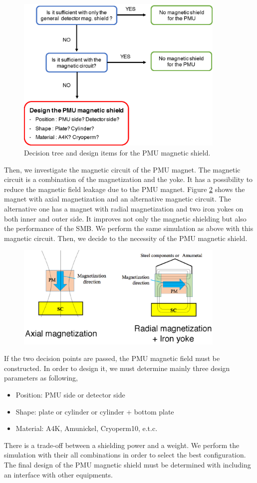 \documentclass[11pt]{article}
\begin{document}
\begin{figure}[htbp]
  \centering
  \includegraphics[width=100mm]{figs/MagShieldDecisionTree.eps}
  \caption{Decision tree and design items for the PMU magnetic shield.}
  \label{fig:DT}
\end{figure}

Then, we investigate the magnetic circuit of the PMU magnet.
The magnetic circuit is a combination of the magnetization and the yoke.
It has a possibility to reduce the magnetic field leakage due to the PMU magnet.
Figure \ref{fig:MC} shows the magnet with axial magnetization and an alternative magnetic circuit.
The alternative one has a magnet with radial magnetization and two iron yokes on both inner and outer side.
It improves not only the magnetic shielding but also the performance of the SMB.
We perform the same simulation as above with this magnetic circuit.
Then, we decide to the necessity of the PMU magnetic shield.

\begin{figure}[htbp]
  \centering
  \includegraphics[width=100mm]{figs/MagneticCircuit.eps}
  \caption{}
  \label{fig:MC}
\end{figure}

If the two decision points are passed, the PMU magnetic field must be constructed.
In order to design it, we must determine mainly three design parameters as following,
\begin{itemize}
 \item Position: PMU side or detector side
 \item Shape: plate or cylinder or cylinder + bottom plate
 \item Material: A4K, Amunickel, Cryoperm10, e.t.c.
\end{itemize}
There is a trade-off between a shielding power and a weight.
We perform the simulation with their all combinations in order to select the best configuration.
The final design of the PMU magnetic shield must be determined with including an interface with other equipments.
\end{document}
